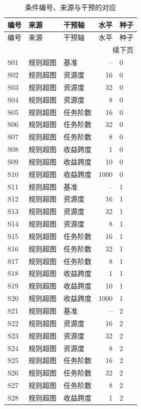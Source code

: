{\small\setlength{\tabcolsep}{5pt}
\begin{longtable}{lllrl}
\caption{条件编号、来源与干预的对应}\label{tab:stress_condition_map}\\
\toprule 编号 & 来源 & 干预轴 & 水平 & 种子\\\midrule
\endfirsthead
\toprule 编号 & 来源 & 干预轴 & 水平 & 种子\\\midrule
\endhead
\midrule\multicolumn{5}{r}{续下页}\\\endfoot
\bottomrule\endlastfoot
S01 & 规则超图 & 基准 & -- & 0\\
S02 & 规则超图 & 资源度 & 16 & 0\\
S03 & 规则超图 & 资源度 & 32 & 0\\
S04 & 规则超图 & 资源度 & 8 & 0\\
S05 & 规则超图 & 任务阶数 & 16 & 0\\
S06 & 规则超图 & 任务阶数 & 32 & 0\\
S07 & 规则超图 & 任务阶数 & 8 & 0\\
S08 & 规则超图 & 收益跨度 & 1 & 0\\
S09 & 规则超图 & 收益跨度 & 10 & 0\\
S10 & 规则超图 & 收益跨度 & 1000 & 0\\
S11 & 规则超图 & 基准 & -- & 1\\
S12 & 规则超图 & 资源度 & 16 & 1\\
S13 & 规则超图 & 资源度 & 32 & 1\\
S14 & 规则超图 & 资源度 & 8 & 1\\
S15 & 规则超图 & 任务阶数 & 16 & 1\\
S16 & 规则超图 & 任务阶数 & 32 & 1\\
S17 & 规则超图 & 任务阶数 & 8 & 1\\
S18 & 规则超图 & 收益跨度 & 1 & 1\\
S19 & 规则超图 & 收益跨度 & 10 & 1\\
S20 & 规则超图 & 收益跨度 & 1000 & 1\\
S21 & 规则超图 & 基准 & -- & 2\\
S22 & 规则超图 & 资源度 & 16 & 2\\
S23 & 规则超图 & 资源度 & 32 & 2\\
S24 & 规则超图 & 资源度 & 8 & 2\\
S25 & 规则超图 & 任务阶数 & 16 & 2\\
S26 & 规则超图 & 任务阶数 & 32 & 2\\
S27 & 规则超图 & 任务阶数 & 8 & 2\\
S28 & 规则超图 & 收益跨度 & 1 & 2\\

\end{longtable}}
